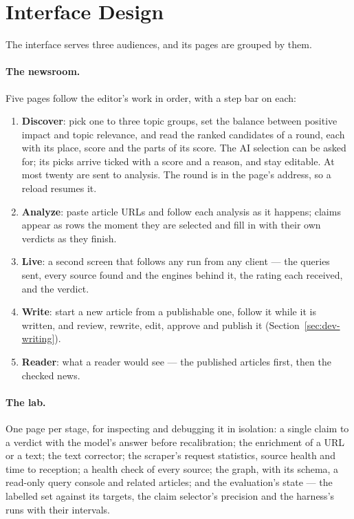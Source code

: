 
\section{Interface Design}
\label{sec:design-interface}

The interface serves three audiences, and its pages are grouped by them.

\paragraph{The newsroom.} Five pages follow the editor's work in order,
with a step bar on each:

\begin{enumerate}
    \item \textbf{Discover}: pick one to three topic groups, set the
    balance between positive impact and topic relevance, and read the
    ranked candidates of a round, each with its place, score and the
    parts of its score. The AI selection can be asked for; its picks
    arrive ticked with a score and a reason, and stay editable. At most
    twenty are sent to analysis. The round is in the page's address, so
    a reload resumes it.
    \item \textbf{Analyze}: paste article URLs and follow each analysis
    as it happens; claims appear as rows the moment they are selected
    and fill in with their own verdicts as they finish.
    \item \textbf{Live}: a second screen that follows any run from any
    client --- the queries sent, every source found and the engines
    behind it, the rating each received, and the verdict.
    \item \textbf{Write}: start a new article from a publishable one,
    follow it while it is written, and review, rewrite, edit, approve
    and publish it (Section~\ref{sec:dev-writing}).
    \item \textbf{Reader}: what a reader would see --- the published
    articles first, then the checked news.
\end{enumerate}

\paragraph{The lab.} One page per stage, for inspecting and debugging
it in isolation: a single claim to a verdict with the model's answer
before recalibration; the enrichment of a URL or a text; the text
corrector; the scraper's request statistics, source health and time to
reception; a health check of every source; the graph, with its schema,
a read-only query console and related articles; and the evaluation's
state --- the labelled set against its targets, the claim selector's
precision and the harness's runs with their intervals.

